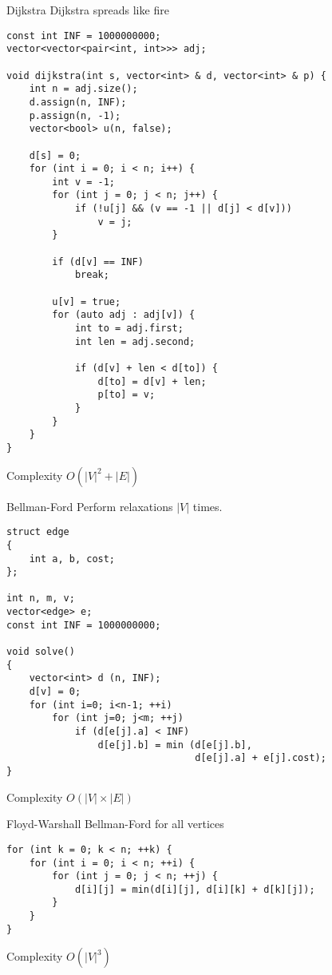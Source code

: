 \documentclass[titlepage, 12pt]{book}
\begin{document}
\begin{algorithm}{Dijkstra}{}
    Dijkstra spreads like fire
\begin{verbatim}
const int INF = 1000000000;
vector<vector<pair<int, int>>> adj;

void dijkstra(int s, vector<int> & d, vector<int> & p) {
    int n = adj.size();
    d.assign(n, INF);
    p.assign(n, -1);
    vector<bool> u(n, false);

    d[s] = 0;
    for (int i = 0; i < n; i++) {
        int v = -1;
        for (int j = 0; j < n; j++) {
            if (!u[j] && (v == -1 || d[j] < d[v]))
                v = j;
        }

        if (d[v] == INF)
            break;

        u[v] = true;
        for (auto adj : adj[v]) {
            int to = adj.first;
            int len = adj.second;

            if (d[v] + len < d[to]) {
                d[to] = d[v] + len;
                p[to] = v;
            }
        }
    }
}
\end{verbatim}


Complexity $O(|V|^2 + |E|)$

\end{algorithm}

\begin{algorithm}{Bellman-Ford}{}
Perform relaxations $|V|$ times.
\begin{verbatim}
struct edge
{
    int a, b, cost;
};

int n, m, v;
vector<edge> e;
const int INF = 1000000000;

void solve()
{
    vector<int> d (n, INF);
    d[v] = 0;
    for (int i=0; i<n-1; ++i)
        for (int j=0; j<m; ++j)
            if (d[e[j].a] < INF)
                d[e[j].b] = min (d[e[j].b],
                                 d[e[j].a] + e[j].cost);
}
\end{verbatim}

Complexity $O(|V| \times |E|)$

\end{algorithm}

\begin{algorithm}{Floyd-Warshall}{}
Bellman-Ford for all vertices
\begin{verbatim}
for (int k = 0; k < n; ++k) {
    for (int i = 0; i < n; ++i) {
        for (int j = 0; j < n; ++j) {
            d[i][j] = min(d[i][j], d[i][k] + d[k][j]); 
        }
    }
}
\end{verbatim}

Complexity $O(|V|^3)$

\end{algorithm}
\end{document}
